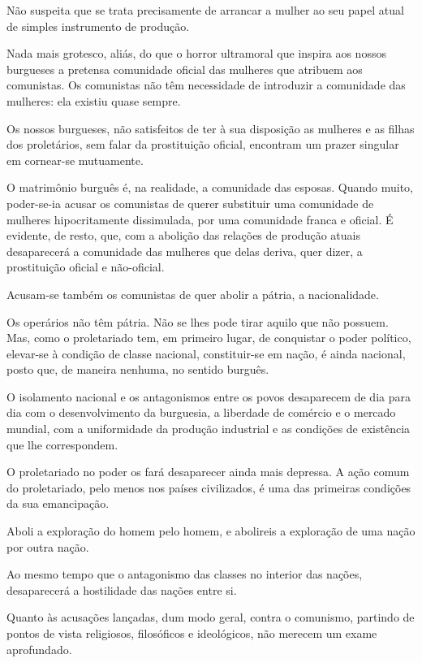 Não suspeita que se trata precisamente de arrancar a mulher ao seu
papel atual de simples instrumento de produção.

Nada mais grotesco, aliás, do que o horror ultramoral que inspira aos
nossos burgueses a pretensa comunidade oficial das mulheres que
atribuem aos comunistas. Os comunistas não têm necessidade de
introduzir a comunidade das mulheres: ela existiu quase sempre.

Os nossos burgueses, não satisfeitos de ter à sua disposição as
mulheres e as filhas dos proletários, sem falar da prostituição
oficial, encontram um prazer singular em cornear-se mutuamente.

O matrimônio burguês é, na realidade, a comunidade das esposas. Quando
muito, poder-se-ia acusar os comunistas de querer substituir uma
comunidade de mulheres hipocritamente dissimulada, por uma comunidade
franca e oficial. É evidente, de resto, que, com a abolição das
relações de produção atuais desaparecerá a comunidade das mulheres que
delas deriva, quer dizer, a prostituição oficial e não-oficial.

Acusam-se também os comunistas de quer abolir a pátria, a
nacionalidade.

Os operários não têm pátria. Não se lhes pode tirar aquilo que não
possuem. Mas, como o proletariado tem, em primeiro lugar, de
conquistar o poder político, elevar-se à condição de classe
nacional, constituir-se em nação, é ainda nacional, posto que, de
maneira nenhuma, no sentido burguês.

O isolamento nacional e os antagonismos entre os povos desaparecem de
dia para dia com o desenvolvimento da burguesia, a liberdade de
comércio e o mercado mundial, com a uniformidade da produção
industrial e as condições de existência que lhe correspondem.

O proletariado no poder os fará desaparecer ainda mais depressa. A
ação comum do proletariado, pelo menos nos países civilizados, é uma
das primeiras condições da sua emancipação.

Aboli a exploração do homem pelo homem, e abolireis a exploração de
uma nação por outra nação.

Ao mesmo tempo que o antagonismo das classes no interior das nações,
desaparecerá a hostilidade das nações entre si.

Quanto às acusações lançadas, dum modo geral, contra o comunismo,
partindo de pontos de vista religiosos, filosóficos e ideológicos, não
merecem um exame aprofundado.

